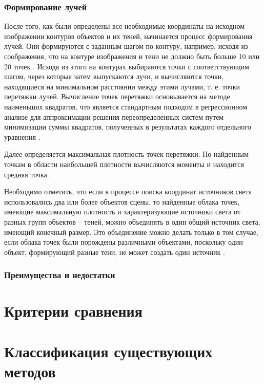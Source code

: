 \subsubsection*{Формирование лучей}

После того, как были определены все необходимые координаты на исходном изображении контуров объектов и их теней, начинается процесс формирования лучей. Они формируются с заданным шагом по контуру, например, исходя из соображения, что на контуре изображения и тени не должно быть больше 10 или 20 точек \cite{sns_tras}. Исходя из этого на контурах выбираются точки с соответствующим шагом, через которые затем выпускаются лучи, и вычисляются точки, находящиеся на минимальном расстоянии между этими лучами, т. е. точки перетяжки лучей. Вычисление точек перетяжки основывается на методе наименьших квадратов, что является стандартным подходом в регрессионном анализе для аппроксимации решения переопределенных систем путем минимизации суммы квадратов, полученных в результатах каждого отдельного уравнения \cite{mnk}.

Далее определяется максимальная плотность точек перетяжки. По найденным точкам в области наибольшей плотности вычисляются моменты и находится средняя точка.

Необходимо отметить, что если в процессе поиска координат источников света использовались два или более объектов сцены, то найденные облака точек, имеющие максимальную плотность и характеризующие источники света от разных групп объектов – теней, можно объединять в один общий источник света, имеющий конечный размер. Это объединение можно делать только в том случае, если облака точек были порождены различными объектами, поскольку один объект, формирующий разные тени, не может создать один источник \cite{sns_tras}.

\subsubsection*{Преимущества и недостатки}

\section{Критерии сравнения}

\section{Классификация существующих методов}